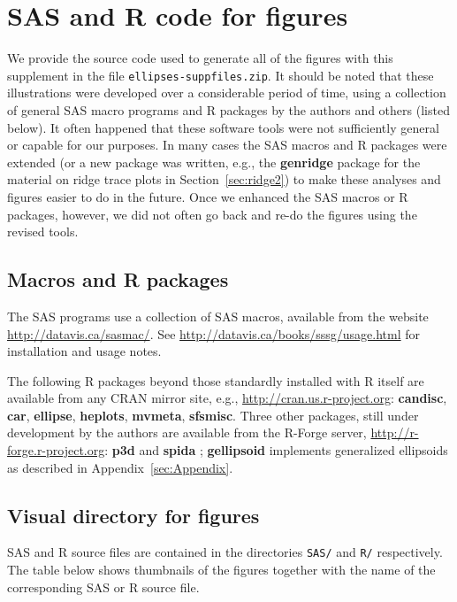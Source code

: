 \documentclass[11pt]{article}%
\newcommand*{\secref}[1]{Section~\ref{#1}}
\newcommand*{\appref}[1]{Appendix~\ref{#1}}
\newcommand*{\pkg}[1]{\textbf{#1}}     %
\newcommand*{\file}[1]{\texttt{#1}}     %
\begin{document}
\section{SAS and R code for figures}\label{sec:SASandR}

We provide the source code used to generate all of the figures with this supplement in the file
\newline
\file{ellipses-suppfiles.zip}.
It should
be noted that these illustrations were developed over a considerable period of time, using a collection
of general SAS macro programs and R packages by the authors and others (listed below). It often happened
that these software tools were not sufficiently general or capable for our purposes.  In many cases the
SAS macros and R packages were extended (or a new package was written, e.g., 
the \pkg{genridge} package \citep{genridge,Friendly:genridge:2012} for the material on ridge trace plots in
\secref{sec:ridge2})
to make these analyses and figures easier to do in the future. Once we enhanced the SAS macros
or R packages, however, we did not often go back and re-do the figures using the revised tools.  

\subsection{Macros and R packages}
The SAS programs use a collection of SAS macros, available from the website \url{http://datavis.ca/sasmac/}.
See  \url{http://datavis.ca/books/sssg/usage.html} for installation and usage notes.

The following R packages beyond those standardly installed with R itself are available from any
CRAN mirror site, e.g., \url{http://cran.us.r-project.org}:
\pkg{candisc}, \pkg{car}, \pkg{ellipse}, \pkg{heplots}, \pkg{mvmeta}, \pkg{sfsmisc}.
Three other packages, still under development by the authors are available from the R-Forge server,
\url{http://r-forge.r-project.org}: \pkg{p3d} \citep{p3d} and \pkg{spida} \citep{spida};
\pkg{gellipsoid} implements generalized ellipsoids as described in \appref{sec:Appendix}.

\subsection{Visual directory for figures}
SAS and R source files are contained in the directories \file{SAS/} and \file{R/} respectively.
The table below shows thumbnails of the figures together with the name of the 
corresponding SAS or R source file.
\newcommand{\Figure}[3]{%
  \begin{tabular}[b]{c}
    Fig. #1 \\\textbf{#3} \\ \texttt{[image: \#2]} 
\end{tabular} 
}
\end{document}
